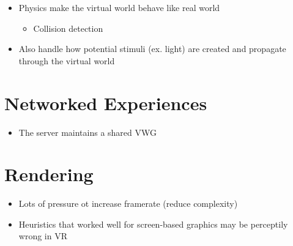   \begin{itemize}
    \item Physics make the virtual world behave like real world
    \begin{itemize}
      \item Collision detection
    \end{itemize}

    \item Also handle how potential stimuli (ex. light) are created and
    propagate through the virtual world
  \end{itemize}

\section{Networked Experiences}

  \begin{itemize}
    \item The server maintains a shared VWG
  \end{itemize}

\section{Rendering}

  \begin{itemize}
    \item Lots of pressure ot increase framerate (reduce complexity)
    \item Heuristics that worked well for screen-based graphics may be
    perceptily wrong in VR
  \end{itemize}
